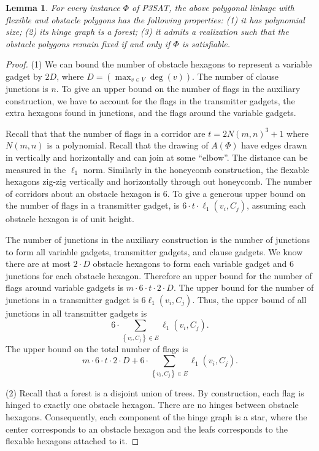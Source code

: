 \documentclass[10pt]{CSUNthesis}
\theoremstyle{plain}%
\newtheorem{lem}{Lemma}
\theoremstyle{definition}
\theoremstyle{remark}
\newcommand{\lr}[1]{\left( #1 \right)}
\begin{document}
\begin{lem}\label{lem:aux-A}
For every instance $\Phi$ of P3SAT, the above polygonal linkage with flexible and obstacle polygons has the following properties: (1) it has polynomial size; (2) its hinge graph is a forest;
(3) it admits a realization such that the obstacle polygons remain fixed if and only if $\Phi$ is satisfiable.
\end{lem}
\begin{proof}

\noindent (1) We can bound the number of obstacle hexagons to represent a variable gadget by $2 D$, where $D = \lr{ \max_{v \in V} \deg (v)}$.  
The number of clause junctions is $n$.
To give an upper bound on the number of flags in the auxiliary construction, we have to account for the flags in the transmitter gadgets, the extra hexagons found in junctions, and the flags around the variable gadgets.

Recall that that the number of flags in a corridor are $ t = 2N(m,n)^3 + 1 $ where $N(m,n)$ is a polynomial. 
Recall that the drawing of $A(\Phi)$ have edges drawn in vertically and horizontally and can join at some ``elbow''.  
The distance can be measured in the $\ell_1$ norm.
Similarly in the honeycomb construction, the flexable hexagons zig-zig vertically and horizontally through out honeycomb.  
The number of corridors about an obstacle hexagon is $6$.
To give a generous upper bound on the number of flags in a transmitter gadget, is $6 \cdot t \cdot \ell_1\lr{v_i,C_j}$, assuming each obstacle hexagon is of unit height.

The number of junctions in the auxiliary construction is the number of junctions to form all variable gadgets, transmitter gadgets, and clause gadgets. 
We know there are at most $2 \cdot D$ obstacle hexagons to form each variable gadget and $6$ junctions for each obstacle hexagon.  
Therefore an upper bound for the number of flags around variable gadgets is $m \cdot 6 \cdot t \cdot 2 \cdot D$.
The upper bound for the number of junctions in a transmitter gadget is $6 \ell_1 \lr{v_i, C_j}$.  
Thus, the upper bound of all junctions in all transmitter gadgets is $$6 \cdot \sum_{\left\lbrace v_i, C_j \right\rbrace \in E} \ell_1 \lr{v_i, C_j}.$$
The upper bound on the total number of flags is
$$m \cdot 6 \cdot t \cdot 2 \cdot D + 6 \cdot \sum_{\left\lbrace v_i, C_j \right\rbrace \in E} \ell_1 \lr{v_i, C_j}.$$

\noindent (2) Recall that a forest is a disjoint union of trees. 
By construction, each flag is hinged to exactly one obstacle hexagon.  
There are no hinges between obstacle hexagons.
Consequently, each component of the hinge graph is a star, where the center corresponds to an obstacle hexagon and the leafs corresponds to the flexable hexagons attached to it.


\end{proof}
\end{document}
